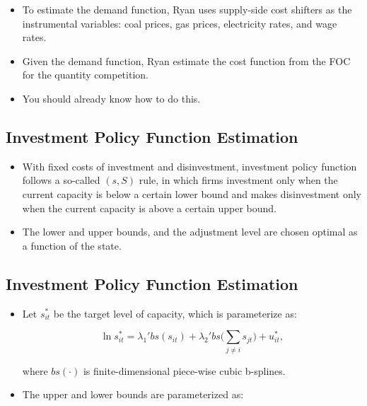 \documentclass[]{book}
\providecommand{\tightlist}{%
  \setlength{\itemsep}{0pt}\setlength{\parskip}{0pt}}
\begin{document}
\begin{itemize}
\tightlist
\item
  To estimate the demand function, Ryan uses supply-side cost shifters
  as the instrumental variables: coal prices, gas prices, electricity
  rates, and wage rates.
\item
  Given the demand function, Ryan estimate the cost function from the
  FOC for the quantity competition.
\item
  You should already know how to do this.
\end{itemize}

\subsection{Investment Policy Function
Estimation}\label{investment-policy-function-estimation}

\begin{itemize}
\tightlist
\item
  With fixed costs of investment and disinvestment, investment policy
  function follows a so-called \((s, S)\) rule, in which firms
  investment only when the current capacity is below a certain lower
  bound and makes disinvestment only when the current capacity is above
  a certain upper bound.
\item
  The lower and upper bounds, and the adjustment level are chosen
  optimal as a function of the state.
\end{itemize}

\subsection{Investment Policy Function
Estimation}\label{investment-policy-function-estimation-1}

\begin{itemize}
\tightlist
\item
  Let \(s_{it}^*\) be the target level of capacity, which is
  parameterize as:

  \begin{equation}
  \ln s_{it}^* = \lambda_1' bs(s_{it}) + \lambda_2' bs \Bigg(\sum_{j \neq i} s_{jt}\Bigg) + u_{it}^*,
  \end{equation}

  where \(bs(\cdot)\) is finite-dimensional piece-wise cubic b-splines.
\item
  The upper and lower bounds are parameterized as:
\end{itemize}
\end{document}
